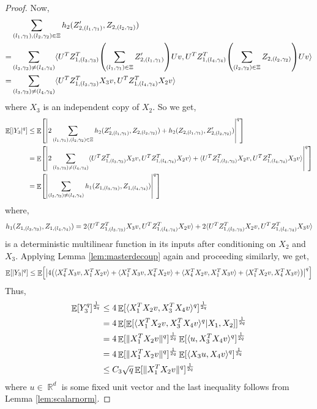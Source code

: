 \documentclass[11pt]{amsart}
\numberwithin{equation}{section}
\numberwithin{equation}{section}
\DeclareMathOperator{\E}{\mathbb{E}}
\DeclareMathOperator{\R}{\mathbb{R}}
\DeclarePairedDelimiter{\norm}{\lVert}{\rVert}
\DeclarePairedDelimiter{\abs}{\lvert}{\rvert}
\DeclarePairedDelimiter{\ip}{\langle}{\rangle}
\DeclarePairedDelimiter{\paren}{(}{)}
\DeclarePairedDelimiter{\sqbr}{[}{]}
\begin{document}
\begin{proof}
Now, 
\begin{align*}
    &\sum_{ (l_1, \gamma_1), (l_2, \gamma_2) \in \Xi} h_2(Z'_{2,(l_1,\gamma_1)}, Z_{2,(l_2,\gamma_2)})\\  =& \sum_{ (l_3, \gamma_3) \neq (l_4, \gamma_4)} \ip{U^TZ^T_{1,(l_3,\gamma_3) } \paren*{ \sum_{ (l_1, \gamma_1)\in \Xi} Z'_{2,(l_1,\gamma_1)}} Uv,U^TZ^T_{1,(l_4,\gamma_4) }\paren*{ \sum_{  (l_2, \gamma_2) \in \Xi}Z_{2,(l_2, \gamma_2)}}Uv} \\
    =& \sum_{ (l_3, \gamma_3) \neq (l_4, \gamma_4)} \ip{U^TZ^T_{1,(l_3,\gamma_3) } X_3  v,U^TZ^T_{1,(l_4,\gamma_4) } X_2 v}
\end{align*}
where $X_3$ is an independent copy of $X_2$. So we get, 
\begin{align*}
    \E \sqbr{\abs{Y_3}^{q}} &\le \E \sqbr*{ \abs*{2 \sum_{ (l_1, \gamma_1), (l_2, \gamma_2) \in \Xi} h_2(Z'_{2,(l_1,\gamma_1)}, Z_{2,(l_2,\gamma_2)}) + h_2(Z_{2,(l_1,\gamma_1)}, Z'_{2,(l_2,\gamma_2)}) }^{q}  } \\
    &= \E \sqbr*{\abs*{2 \sum_{ (l_3, \gamma_3) \neq (l_4, \gamma_4)} \ip{U^TZ^T_{1,(l_3,\gamma_3) } X_3  v,U^TZ^T_{1,(l_4,\gamma_4) } X_2 v} + \ip{U^TZ^T_{1,(l_3,\gamma_3) } X_2  v,U^TZ^T_{1,(l_4,\gamma_4) } X_3 v} }^{q}  } \\
    &= \E \sqbr*{\abs*{ \sum_{ (l_3, \gamma_3) \neq (l_4, \gamma_4)} h_1(Z_{1,(l_3,\gamma_3)}, Z_{1,(l_4,\gamma_4)}) }^{q} } \\
\end{align*}
where, 
\[ h_1(Z_{1,(l_3,\gamma_3)}, Z_{1,(l_4,\gamma_4)}) = 2\ip{U^TZ^T_{1,(l_3,\gamma_3) } X_3  v,U^TZ^T_{1,(l_4,\gamma_4) } X_2 v} + 2\ip{U^TZ^T_{1,(l_3,\gamma_3) } X_2  v,U^TZ^T_{1,(l_4,\gamma_4) } X_3 v} \] 
is a deterministic multilinear function in its inputs after conditioning on $X_2$ and $X_3$. Applying Lemma \ref{lem:masterdecoup} again and proceeding similarly, we get,
\begin{align*}
    \E \sqbr{\abs{Y_3}^{q}} &\le \E \sqbr*{\abs*{ 4 \paren*{ \ip{X_4^T X_3  v, X_1^T X_2 v} + \ip{X_1^T X_3  v, X_4^T X_2 v} + \ip{X_4^T X_2  v, X_1^T X_3 v} + \ip{X_1^T X_2  v, X_4^T X_3 v} } }^{q}} \\
\end{align*}
Thus,
\begin{align*}
    \E \sqbr{Y_3^{q}}^\frac{1}{2q} &\le 4 \E \sqbr{\ip{X_1^TX_2v,X_3^TX_4v}^{q}}^\frac{1}{2q} \\
    &=  4 \E \sqbr{ \E \sqbr{\ip{X_1^TX_2v,X_3^TX_4v}^{q} \vert X_1, X_2} }^\frac{1}{2q} \\
    &= 4 \E \sqbr{ \norm{X_1^TX_2v}^q}^\frac{1}{2q} \E \sqbr{\ip{u,X_3^TX_4v}^{q}}^\frac{1}{2q} \\
    &=  4 \E \sqbr{ \norm{X_1^TX_2v}^q}^\frac{1}{2q} \E \sqbr{\ip{X_3u,X_4v}^{q}}^\frac{1}{2q} \\
    &\le C_3 \sqrt{q} \E \sqbr{ \norm{X_1^TX_2v}^q}^\frac{1}{2q}
\end{align*}
where $u \in \R^d$ is some fixed unit vector and the last inequality follows from Lemma \ref{lem:scalarnorm}.


\end{proof}
\end{document}
